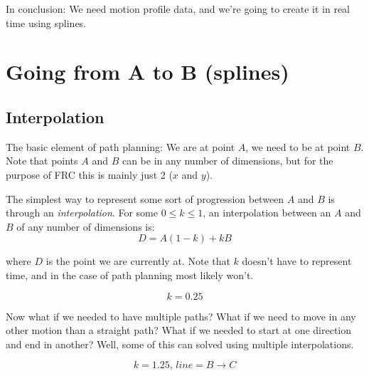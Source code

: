 \documentclass[12pt, english]{article}
\begin{document}
\par
In conclusion: We need motion profile data, and we're going to create it in real time using splines.


\pagebreak

\section{Going from A to B (splines)}
\subsection{Interpolation}
The basic element of path planning: We are at point $A$, we need to be at point $B$. Note that points $A$ and $B$ can be in any number of dimensions, but for the purpose of FRC this is mainly just 2 ($x$ and $y$). \\\par
The  simplest way to represent some sort of progression between $A$ and $B$ is through an \textit{interpolation}. For some $0 \leq k \leq 1$, an interpolation between an $A$ and $B$ of any number of dimensions is:
\[ D = A(1-k) + kB \]

\par
where $D$ is the point we are currently at. Note that $k$ doesn't have to represent time, and in the case of path planning most likely won't. 

\begin{center}
	\[ k = 0.25 \]
\end{center}

\par
Now what if we needed to have multiple paths? What if we need to move in any other motion than a straight path? What if we needed to start at one direction and end in another? Well, some of this can solved using multiple interpolations.

\begin{center}
	\[ k = 1.25,\,line=B \to C \]
\end{center}
\end{document}
